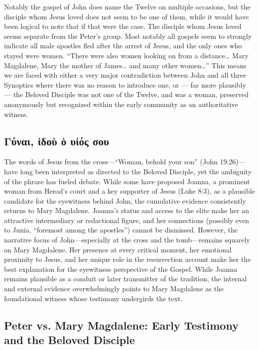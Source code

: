 Notably the gospel of John does name the Twelve on multiple occasions, but the disciple whom Jesus loved does not seem to be one of them, while it would have been logical to note that if that were the case.
The disciple whom Jesus loved seems separate from the Peter's group.
Most notably all gospels seem to strongly indicate all male apostles fled after the arrest of Jesus, and the only ones who stayed were women.
``There were also women looking on from a distance\ldots{} Mary Magdalene, Mary the mother of James\ldots{} and many other women\ldots'' This means we are faced with either a very major contradiction between John and all three Synoptics where there was no reason to introduce one, or --- far more plausibly --- the Beloved Disciple was not one of the Twelve, and was a woman, preserved anonymously but recognized within the early community as an authoritative witness.

\subsection{Γύναι, ἰδοὺ ὁ υἱός σου}\label{subsec:ux3b3ux3cdux3b9-ux1f30ux3b4ux3bfux1f7a-ux1f41-ux3c5ux1f31ux3ccux3c2-ux3c3ux3bfux3c5}

The words of Jesus from the cross—“Woman, behold your son” (John 19:26)—have long been interpreted as directed to the Beloved Disciple, yet the ambiguity of the phrase has fueled debate. While some have proposed Joanna, a prominent woman from Herod’s court and a key supporter of Jesus (Luke 8:3), as a plausible candidate for the eyewitness behind John, the cumulative evidence consistently returns to Mary Magdalene. Joanna’s status and access to the elite make her an attractive intermediary or redactional figure, and her connections (possibly even to Junia, “foremost among the apostles”) cannot be dismissed. However, the narrative focus of John—especially at the cross and the tomb—remains squarely on Mary Magdalene. Her presence at every critical moment, her emotional proximity to Jesus, and her unique role in the resurrection account make her the best explanation for the eyewitness perspective of the Gospel. While Joanna remains plausible as a conduit or later transmitter of the tradition, the internal and external evidence overwhelmingly points to Mary Magdalene as the foundational witness whose testimony undergirds the text.

\subsection{Peter vs. Mary Magdalene: Early Testimony and the Beloved Disciple}\label{subsec:when-the-authors-of-the-apocryphal-gospel-of-mary-or-other-early-texts-try-to-argue-who-the-beloved-disciple-is-they-argue-that-it-is-mary-magdalene-rather-than-peter.}


